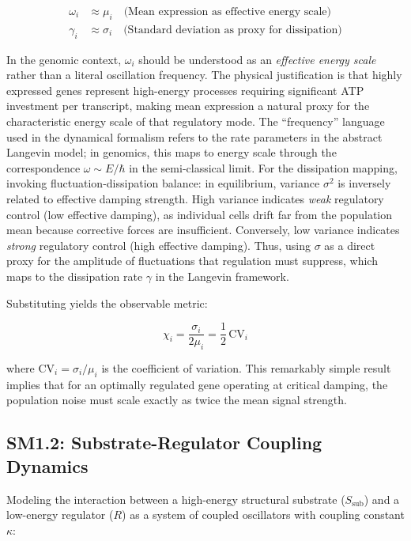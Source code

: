 \documentclass[11pt,letterpaper]{article}
\begin{document}
\begin{align}
\omega_i &\approx \mu_i \quad \text{(Mean expression as effective energy scale)} \\
\gamma_i &\approx \sigma_i \quad \text{(Standard deviation as proxy for dissipation)}
\end{align}

In the genomic context, $\omega_i$ should be understood as an \textit{effective energy scale} rather than a literal oscillation frequency. The physical justification is that highly expressed genes represent high-energy processes requiring significant ATP investment per transcript, making mean expression a natural proxy for the characteristic energy scale of that regulatory mode. The ``frequency'' language used in the dynamical formalism refers to the rate parameters in the abstract Langevin model; in genomics, this maps to energy scale through the correspondence $\omega \sim E/\hbar$ in the semi-classical limit. For the dissipation mapping, invoking fluctuation-dissipation balance: in equilibrium, variance $\sigma^2$ is inversely related to effective damping strength. High variance indicates \textit{weak} regulatory control (low effective damping), as individual cells drift far from the population mean because corrective forces are insufficient. Conversely, low variance indicates \textit{strong} regulatory control (high effective damping). Thus, using $\sigma$ as a direct proxy for the amplitude of fluctuations that regulation must suppress, which maps to the dissipation rate $\gamma$ in the Langevin framework.

Substituting yields the observable metric:

\begin{equation}
\chi_i = \frac{\sigma_i}{2\mu_i} = \frac{1}{2} \, \text{CV}_i
\end{equation}

where $\text{CV}_i = \sigma_i/\mu_i$ is the coefficient of variation. This remarkably simple result implies that for an optimally regulated gene operating at critical damping, the population noise must scale exactly as twice the mean signal strength.

\subsection{SM1.2: Substrate-Regulator Coupling Dynamics}

Modeling the interaction between a high-energy structural substrate ($S_{\text{sub}}$) and a low-energy regulator ($R$) as a system of coupled oscillators with coupling constant $\kappa$:
\end{document}
